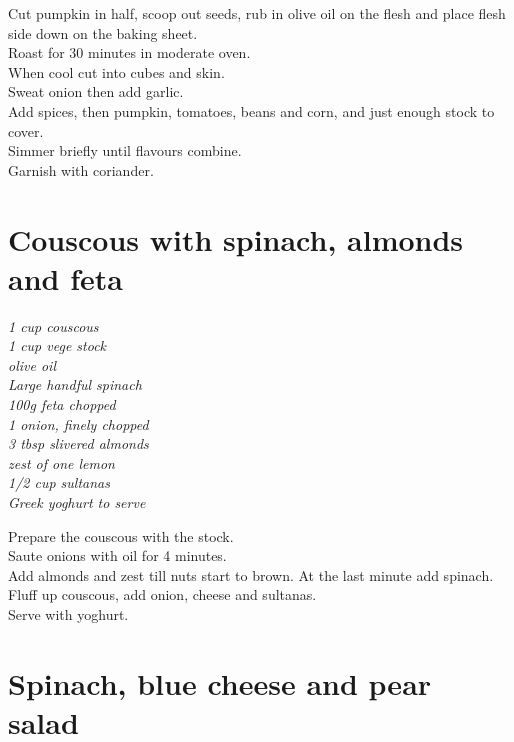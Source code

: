 \documentclass{tufte-book}
\begin{document}
\smallskip
Cut pumpkin in half, scoop out seeds, rub in olive oil on the flesh and place flesh side down on the baking sheet.
\\Roast for 30 minutes in moderate oven.
\\When cool cut into cubes and skin.
\\Sweat onion then add garlic.
\\Add spices, then pumpkin, tomatoes, beans and corn, and just enough stock to cover.
\\Simmer briefly until flavours combine. 
\\Garnish with coriander.



\section{Couscous with spinach, almonds and feta}

\emph{1 cup couscous
\\1 cup vege stock
\\olive oil
\\Large handful spinach
\\100g feta chopped
\\1 onion, finely chopped
\\3 tbsp slivered almonds
\\zest of one lemon
\\1/2 cup sultanas
\\Greek yoghurt to serve
}

\smallskip
Prepare the couscous with the stock.
\\Saute onions with oil for 4 minutes.
\\Add almonds and zest till nuts start to brown. At the last minute add spinach.
\\Fluff up couscous, add onion, cheese and sultanas.
\\Serve with yoghurt.



\section{Spinach, blue cheese and pear salad}
\end{document}
